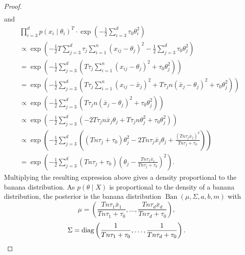 \documentclass[english,twoside,openright]{HYgraduMLDS}
\DeclareMathOperator{\ban}{Ban}
\DeclareMathOperator{\diag}{diag}
\DeclareMathOperator{\clip}{clip}
\begin{document}
\begin{appendices}
\begin{proof}
\begin{align*}
    \end{align*}
    and
    \begin{align*}
        &\prod_{i=3}^d p(x_i\mid \theta_i)^T
        \cdot \exp\left(-\frac{1}{2}\sum_{i=3}^d \tau_0\theta_i^2\right)
      \\&\propto \exp\left(-\frac{1}{2}T\sum_{j=3}^d\tau_j\sum_{i=1}^n (x_{ij} - \theta_j)^2
      - \frac{1}{2}\sum_{j=3}^d\tau_0\theta_j^2\right)
      \\&= \exp\left(-\frac{1}{2}\sum_{j=3}^d\left(T\tau_j\sum_{i=1}^n (x_{ij} - \theta_j)^2
      + \tau_0\theta_j^2\right)\right)
      \\&= \exp\left(-\frac{1}{2}\sum_{j=3}^d\left(T\tau_j\sum_{i=1}^n (x_{ij} - \bar{x}_j)^2
      + T\tau_j n(\bar{x}_j - \theta_j)^2 + \tau_0\theta_j^2\right)\right)
      \\&\propto \exp\left(-\frac{1}{2}\sum_{j=3}^d\left(T\tau_j n(\bar{x}_j - \theta_j)^2
      + \tau_0\theta_j^2\right)\right)
      \\&\propto \exp\left(-\frac{1}{2}\sum_{j=3}^d\left(
      -2T\tau_j n\bar{x}_j\theta_j + T\tau_jn\theta_j^2
      + \tau_0\theta_j^2\right)\right)
      \\&\propto \exp\left(-\frac{1}{2}\sum_{j=3}^d\left(
      (Tn\tau_j + \tau_0)\theta_j^2
      - 2Tn\tau_j\bar{x}_j\theta_j + \frac{(Tn\tau_j\bar{x}_j)^2}{Tn\tau_j + \tau_0}\right)\right)
      \\&= \exp\left(-\frac{1}{2}\sum_{j=3}^d (Tn\tau_j + \tau_0)\left(\theta_j
      - \frac{Tn\tau_1\bar{x}_i}{Tn\tau_j + \tau_0}\right)^2\right).
    \end{align*}
    Multiplying the resulting expression above gives a density proportional
    to the banana distribution.
    As \(p(\theta\mid X)\) is proportional to the density of a
    banana distribution, the posterior is the banana distribution
    \(\ban(\mu, \Sigma, a, b, m)\)
    with
    \[
        \mu = \left(\frac{Tn\tau_1\bar{x}_1}{Tn\tau_1 + \tau_0},\dotsc,
        \frac{Tn\tau_d\bar{x}_d}{Tn\tau_d + \tau_0}\right),
    \]
    \[
        \Sigma = \diag\left(
            \frac{1}{Tn\tau_1 + \tau_0},\dotsc,
            \frac{1}{Tn\tau_d + \tau_0}
        \right).
        \qedhere
    \]
\end{proof}
\setcounter{lemma}{\value{temp_counter}}
\setcounter{chapter}{\value{temp_counter_chap}}



\end{appendices}
\end{document}
